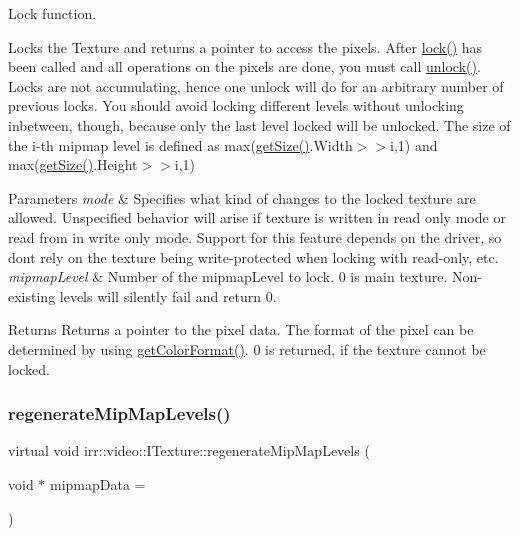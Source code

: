 Lock function. 

Locks the Texture and returns a pointer to access the pixels. After \hyperlink{classirr_1_1video_1_1ITexture_aa09ee89973a645ebdd2bd61ed859df38}{lock()} has been called and all operations on the pixels are done, you must call \hyperlink{classirr_1_1video_1_1ITexture_a15b9a25aa18528ade37a492bd7b20a10}{unlock()}. Locks are not accumulating, hence one unlock will do for an arbitrary number of previous locks. You should avoid locking different levels without unlocking inbetween, though, because only the last level locked will be unlocked. The size of the i-\/th mipmap level is defined as max(\hyperlink{classirr_1_1video_1_1ITexture_adfcf9558c0f1ae543782c03f7903c48e}{get\+Size()}.Width$>$$>$i,1) and max(\hyperlink{classirr_1_1video_1_1ITexture_adfcf9558c0f1ae543782c03f7903c48e}{get\+Size()}.Height$>$$>$i,1) 
\begin{DoxyParams}{Parameters}
{\em mode} & Specifies what kind of changes to the locked texture are allowed. Unspecified behavior will arise if texture is written in read only mode or read from in write only mode. Support for this feature depends on the driver, so don\textquotesingle{}t rely on the texture being write-\/protected when locking with read-\/only, etc. \\
\hline
{\em mipmap\+Level} & Number of the mipmap\+Level to lock. 0 is main texture. Non-\/existing levels will silently fail and return 0. \\
\hline
\end{DoxyParams}
\begin{DoxyReturn}{Returns}
Returns a pointer to the pixel data. The format of the pixel can be determined by using \hyperlink{classirr_1_1video_1_1ITexture_a48bbc0208c046724fc3264406f774132}{get\+Color\+Format()}. 0 is returned, if the texture cannot be locked. 
\end{DoxyReturn}
\mbox{\label{classirr_1_1video_1_1ITexture_a9517c37f071479d0698cdf597f8fea45}} 
\subsubsection{\texorpdfstring{regenerate\+Mip\+Map\+Levels()}{regenerateMipMapLevels()}\hspace{0.1cm}{\footnotesize\ttfamily [1/2]}}
{\footnotesize\ttfamily virtual void irr\+::video\+::\+I\+Texture\+::regenerate\+Mip\+Map\+Levels (\begin{DoxyParamCaption}\item[{void $\ast$}]{mipmap\+Data = {} }\end{DoxyParamCaption})\hspace{0.3cm}{\ttfamily [pure virtual]}}



